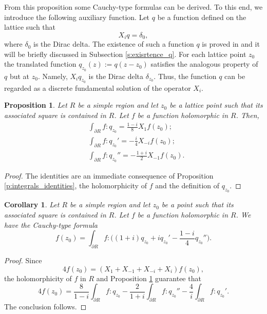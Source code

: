 \documentclass[12pt,a4paper,reqno]{amsart}
\newtheorem{prop}[thm]{Proposition}
\newtheorem{cor}[thm]{Corollary}
\theoremstyle{definition}
\theoremstyle{definition}\newtheorem{defn}[thm]{Definition}
\begin{document}
    From this proposition some Cauchy-type formulas can be derived. To this end, we introduce the following auxiliary function.  Let $q$ be a function defined on the lattice such that
    \begin{equation}\label{eq:q}
     X_iq=\delta_0,
    \end{equation}
    where $\delta_0$ is the Dirac delta.
    The existence of such a function $q$ is proved in \cite{D} and it will be briefly discussed in Subsection \ref{s:exisrtence_q}. For each lattice point $z_0$ the translated function $q_{z_0}(z):=q(z-z_0)$ satisfies the analogous property of $q$ but at $z_0$. Namely, $X_iq_{z_0}$ is the Dirac delta $\delta_{z_0}$. Thus, the function $q$ can be regarded as a discrete fundamental solution of the operator $X_i$. 
    
    
    
    \begin{prop}\label{p:integrals_q}
    Let $R$ be a simple region and let $z_0$ be a lattice point such that its associated square is contained in $R$. Let $f$ be a function holomorphic in $R$. Then,
    \begin{align*}
       &\int_{\partial R} f:q_{z_0}=\frac{1-i}{8}X_{1}f(z_0);\\
       &\int_{\partial R}f:q_{z_0}'=-\frac{i}{4}X_{-i}f(z_0);\\
       &\int_{\partial R}f:q_{z_0}''=-\frac{1+i}{2}X_{-1}f(z_0).
       \end{align*}
    \end{prop}
    
    \begin{proof}
    The identities are an immediate consequence of Proposition \ref{p:integrals_identities}, the holomorphicity of $f$ and the definition of $q_{z_0}$.
    \end{proof}
    \begin{cor}\label{l:cauchy_formula}
    Let $R$ be a simple region and let $z_0$ be a point such that its associated square is contained in $R$. Let $f $ be a function holomorphic in $R$. We have the Cauchy-type formula
    \begin{equation}\label{eq:cauchy}
    f(z_0)=\int_{\partial R} f:\big((1+i)q_{z_0}+iq_{z_0}'-\frac{1-i}{4}q_{z_0}''\big).    
    \end{equation}
    \end{cor}
    \begin{proof}
    Since
    \[
    4f(z_0)=(X_1+X_{-1}+X_{-i}+X_i)f(z_0),
    \]
    the holomorphicity of $f$ in $R$ and Proposition \ref{p:integrals_q} guarantee that 
    \[
    4f(z_0)=\frac{8}{1-i}\int_{\partial R}f:q_{z_0}-\frac{2}{1+i}\int_{\partial R}f:q_{z_0}''-\frac{4}{i}\int_{\partial R} f:q_{z_0}'.
    \]
    The conclusion follows.
    \end{proof}
    
\end{document}
